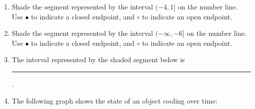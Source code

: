 \documentclass[twoside, 10pt]{article}
\begin{document}
\begin{enumerate}[leftmargin=*]
\item  Shade the segment represented by the interval \((-4, 1]\) on the number line. Use $\bullet$ to indicate a closed endpoint, and $\circ$ to indicate an open endpoint.
\begin{center}
\end{center}
\item  Shade the segment represented by the interval \((-\infty, -6]\) on the number line. Use $\bullet$ to indicate a closed endpoint, and $\circ$ to indicate an open endpoint.
\begin{center}
\end{center}
\item The interval represented by the shaded segment below is \rule{10em}{0.1pt} .
\begin{center}
\end{center}
\item
The following graph shows the state of an object cooling over time:


\end{enumerate}
\end{document}
